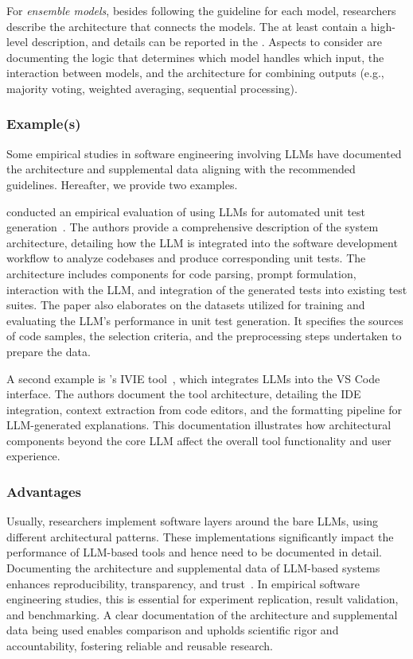 For \emph{ensemble models}, besides following the \modelversion guideline for each model, researchers \must describe the architecture that connects the models.
The \paper \must at least contain a high-level description, and details can be reported in the \supplementarymaterial.
Aspects to consider are documenting the logic that determines which model handles which input, the interaction between models, and the architecture for combining outputs (e.g., majority voting, weighted averaging, sequential processing).

\subsubsection{Example(s)}

Some empirical studies in software engineering involving LLMs have documented the architecture and supplemental data aligning with the recommended guidelines. Hereafter, we provide two examples.

\citeauthor{DBLP:journals/tse/SchaferNET24} conducted an empirical evaluation of using LLMs for automated unit test generation~\cite{DBLP:journals/tse/SchaferNET24}. The authors provide a comprehensive description of the system architecture, detailing how the LLM is integrated into the software development workflow to analyze codebases and produce corresponding unit tests. The architecture includes components for code parsing, prompt formulation, interaction with the LLM, and integration of the generated tests into existing test suites. The paper also elaborates on the datasets utilized for training and evaluating the LLM's performance in unit test generation. It specifies the sources of code samples, the selection criteria, and the preprocessing steps undertaken to prepare the data.

A second example is \citeauthor{DBLP:conf/chi/YanHWH24}'s IVIE tool~\cite{DBLP:conf/chi/YanHWH24}, which integrates LLMs into the VS Code interface. The authors document the tool architecture, detailing the IDE integration, context extraction from code editors, and the formatting pipeline for LLM-generated explanations. This documentation illustrates how architectural components beyond the core LLM affect the overall tool functionality and user experience.

\subsubsection{Advantages}

Usually, researchers implement software layers around the bare LLMs, using different architectural patterns.
These implementations significantly impact the performance of LLM-based tools and hence need to be documented in detail.
Documenting the architecture and supplemental data of LLM-based systems enhances reproducibility, transparency, and trust~\cite{DBLP:journals/software/LuZXXW24}.
In empirical software engineering studies, this is essential for experiment replication, result validation, and benchmarking. A clear documentation of the architecture and supplemental data being used enables comparison and upholds scientific rigor and accountability, fostering reliable and reusable research.


